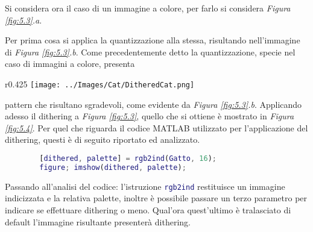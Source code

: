 \documentclass{subfiles}
\begin{document}
Si considera ora il caso di un immagine a colore, per farlo si considera \emph{Figura \ref{fig:5.3}.a}.

Per prima cosa si applica la quantizzazione alla stessa, risultando nell'immagine di \emph{Figura \ref{fig:5.3}.b}.
Come precedentemente detto la quantizzazione, specie nel caso di immagini a colore, presenta
\begin{wrapfigure}{r}{0.425\textwidth}
    \centering
    \texttt{[image: ../Images/Cat/DitheredCat.png]}
    \caption{Dithering applicato a \emph{Figura \ref{fig:5.3}.b}.}
    \label{fig:5.4}
\end{wrapfigure}
pattern che risultano sgradevoli, come evidente da \emph{Figura \ref{fig:5.3}.b}.
Applicando adesso il dithering a \emph{Figura \ref{fig:5.3}}, quello che si ottiene è mostrato in \emph{Figura \ref{fig:5.4}}.
Per quel che riguarda il codice MATLAB utilizzato per l'applicazione del dithering, questi è di seguito riportato ed analizzato.
\begin{center}
    \begin{lstlisting}[language = MATLAB]
        % Caricamento di Gatto.png
        [dithered, palette] = rgb2ind(Gatto, 16);
        figure; imshow(dithered, palette); 
    \end{lstlisting}
\end{center}
Passando all'analisi del codice: l'istruzione \lstinline[language = MATLAB]{rgb2ind} restituisce un immagine indicizzata e la relativa palette,
inoltre è possibile passare un terzo parametro per indicare se effettuare dithering o meno.
Qual'ora quest'ultimo è tralasciato di default l'immagine risultante presenterà dithering.
\end{document}
